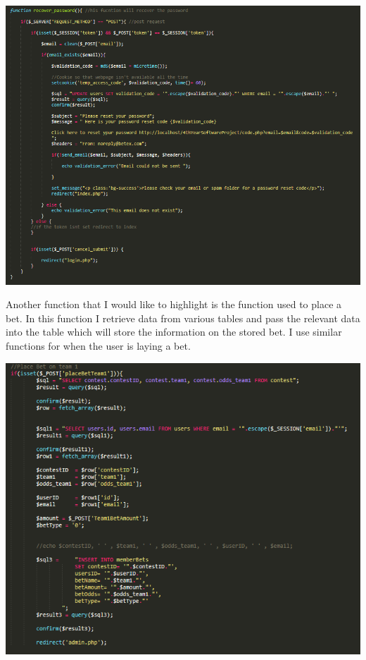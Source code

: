 \includegraphics[width=\textwidth,height=\textheight,keepaspectratio]{img/recover.png}

Another function that I would like to highlight is the function used to place a bet. In this function I retrieve data from various tables and pass the relevant data into the table which will store the information on the stored bet. I use similar functions for when the user is laying a bet. 

\includegraphics[width=\textwidth,height=\textheight,keepaspectratio]{img/placeBet.png}




